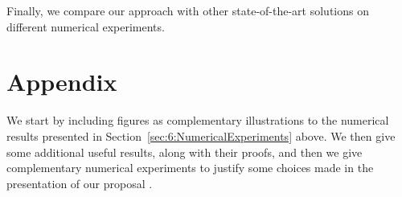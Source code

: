%
Finally, we compare our approach with other state-of-the-art solutions on different numerical experiments.

\minitocStartChapter{}









\newpage
\section{Appendix}
\label{sec:6:appendix}

We start by including figures as complementary illustrations to the numerical results presented in Section~\ref{sec:6:NumericalExperiments} above.
We then give some additional useful results, along with their proofs, and then we give complementary numerical experiments to justify some choices made in the presentation of our proposal \GLRklUCB.


